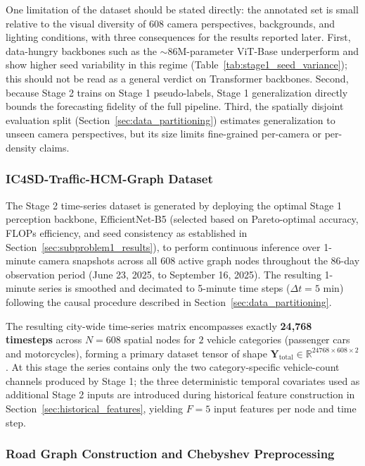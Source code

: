 \documentclass[preprint,12pt]{elsarticle}
\begin{document}
One limitation of the dataset should be stated directly: the annotated set is small relative to the visual diversity of 608 camera perspectives, backgrounds, and lighting conditions, with three consequences for the results reported later. First, data-hungry backbones such as the $\sim$86M-parameter ViT-Base underperform and show higher seed variability in this regime (Table~\ref{tab:stage1_seed_variance}); this should not be read as a general verdict on Transformer backbones. Second, because Stage 2 trains on Stage 1 pseudo-labels, Stage 1 generalization directly bounds the forecasting fidelity of the full pipeline. Third, the spatially disjoint evaluation split (Section~\ref{sec:data_partitioning}) estimates generalization to unseen camera perspectives, but its size limits fine-grained per-camera or per-density claims.


\subsubsection{IC4SD-Traffic-HCM-Graph Dataset}

The Stage 2 time-series dataset is generated by deploying the optimal Stage 1 perception backbone, EfficientNet-B5 (selected based on Pareto-optimal accuracy, FLOPs efficiency, and seed consistency as established in Section~\ref{sec:subproblem1_results}), to perform continuous inference over 1-minute camera snapshots across all 608 active graph nodes throughout the 86-day observation period (June 23, 2025, to September 16, 2025). The resulting 1-minute series is smoothed and decimated to 5-minute time steps ($\Delta t = 5$ min) following the causal procedure described in Section~\ref{sec:data_partitioning}.

The resulting city-wide time-series matrix encompasses exactly \textbf{24,768 timesteps} across $N=608$ spatial nodes for $2$ vehicle categories (passenger cars and motorcycles), forming a primary dataset tensor of shape $\mathbf{Y}_{\text{total}} \in \mathbb{R}^{24768 \times 608 \times 2}$. At this stage the series contains only the two category-specific vehicle-count channels produced by Stage 1; the three deterministic temporal covariates used as additional Stage 2 inputs are introduced during historical feature construction in Section~\ref{sec:historical_features}, yielding $F=5$ input features per node and time step.


\subsubsection{Road Graph Construction and Chebyshev Preprocessing}
\end{document}
